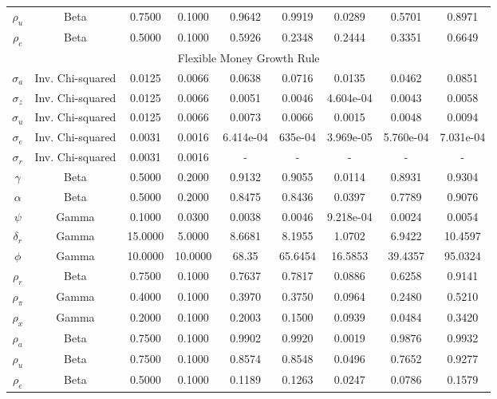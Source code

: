 \documentclass[11pt,preprint, authoryear]{elsarticle}
\let\origtable\table
\let\endorigtable\endtable
\renewenvironment{table}[1][2] {
    \expandafter\origtable\expandafter[H]
} {
    \endorigtable
}
\numberwithin{equation}{section}
\numberwithin{figure}{section}
\numberwithin{table}{section}
\begin{document}
\begin{table}
\begin{center}
\begin{tabular}{|c|c|c|c|c|c|c|c|c|}
$ {\rho_u} $ & Beta & 0.7500  & 0.1000 & 0.9642 & 0.9919 & 0.0289 & 0.5701 & 0.8971 \\ 
$ {\rho_e} $ & Beta & 0.5000  & 0.1000 & 0.5926 &  0.2348 & 0.2444& 0.3351 & 0.6649 \\ 
\hline
\multicolumn{9}{|c|}{Flexible Money Growth Rule} \\
\cline{1-9}
$ {\sigma_a} $ & Inv. Chi-squared & 0.0125 & 0.0066  & 0.0638 & 0.0716 & 0.0135 & 0.0462 & 0.0851\\ 
$ {\sigma_z} $ & Inv. Chi-squared  & 0.0125  & 0.0066 & 0.0051 & 0.0046 &  4.604e-04 & 0.0043 & 0.0058 \\ 
$ {\sigma_u} $ & Inv. Chi-squared & 0.0125  & 0.0066 & 0.0073 & 0.0066 & 0.0015 & 0.0048 & 0.0094\\ 
$ {\sigma_e} $ & Inv. Chi-squared & 0.0031  & 0.0016 & 6.414e-04 & 635e-04 & 3.969e-05 &  5.760e-04 & 7.031e-04\\ 
$ {\sigma_r} $ & Inv. Chi-squared & 0.0031  & 0.0016 & - & - & - & - & -\\ 
$ {\gamma} $ & Beta & 0.5000  & 0.2000 & 0.9132 & 0.9055 & 0.0114 & 0.8931 & 0.9304 \\ 
$ {\alpha} $ & Beta & 0.5000 & 0.2000 & 0.8475 &  0.8436 & 0.0397 & 0.7789 & 0.9076\\ 
$ {\psi} $ & Gamma & 0.1000  & 0.0300 & 0.0038 & 0.0046 & 9.218e-04 & 0.0024 & 0.0054 \\ 
$ {\delta_r} $ & Gamma & 15.0000 & 5.0000 & 8.6681 & 8.1955 & 1.0702 & 6.9422 & 10.4597\\ 
$ {\phi} $ & Gamma & 10.0000 & 10.0000 & 68.35 & 65.6454 & 16.5853 & 39.4357 & 95.0324\\ 
$ {\rho_r} $ & Beta & 0.7500 & 0.1000 & 0.7637 & 0.7817 & 0.0886 & 0.6258 & 0.9141\\ 
$ {\rho_\pi} $ & Gamma & 0.4000  & 0.1000 & 0.3970 & 0.3750 & 0.0964 & 0.2480 & 0.5210\\ 
$ {\rho_x} $ & Gamma & 0.2000  & 0.1000 & 0.2003 & 0.1500 & 0.0939 & 0.0484 & 0.3420\\ 
$ {\rho_a} $ & Beta & 0.7500 & 0.1000  &  0.9902 & 0.9920 & 0.0019 & 0.9876 & 0.9932\\ 
$ {\rho_u} $ & Beta & 0.7500  & 0.1000 & 0.8574 & 0.8548 & 0.0496 & 0.7652 & 0.9277\\ 
$ {\rho_e} $ & Beta & 0.5000  & 0.1000 & 0.1189 & 0.1263 & 0.0247 & 0.0786 & 0.1579 \\ 
\hline
\end{tabular}
\end{center}
\label{tab_post}
\end{table}
\end{document}
